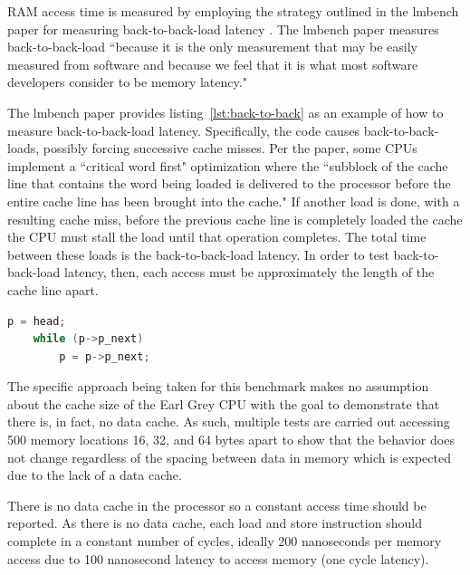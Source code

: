\documentclass{article}
\begin{document}
RAM access time is measured by employing the strategy outlined in the lmbench paper for measuring back-to-back-load latency \cite{lmbench}. The lmbench paper measures back-to-back-load ``because it is the only measurement that may be easily measured from software and because we feel that it is what most software developers consider to be memory latency." \cite{lmbench} 

The lmbench paper provides listing~\ref{lst:back-to-back} as an example of how to measure back-to-back-load latency. Specifically, the code causes back-to-back-loads, possibly forcing successive cache misses. Per the paper, some CPUs implement a ``critical word first" optimization where the ``subblock of the cache line that contains the word being loaded is delivered to the processor before the entire cache line has been brought into the cache." \cite{lmbench} If another load is done, with a resulting cache miss, before the previous cache line is completely loaded the cache the CPU must stall the load until that operation completes. The total time between these loads is the back-to-back-load latency. In order to test back-to-back-load latency, then, each access must be approximately the length of the cache line apart.

\begin{lstlisting}[language=c, caption={lmbench back-to-back memory test example}, label={lst:back-to-back}]
    p = head;
    while (p->p_next)
        p = p->p_next;
\end{lstlisting}


The specific approach being taken for this benchmark makes no assumption about the cache size of the Earl Grey CPU with the goal to demonstrate that there is, in fact, no data cache. As such, multiple tests are carried out accessing 500 memory locations 16, 32, and 64 bytes apart to show that the behavior does not change regardless of the spacing between data in memory which is expected due to the lack of a data cache.

There is no data cache in the processor so a constant access time should be reported. As there is no data cache, each load and store instruction should complete in a constant number of cycles, ideally 200 nanoseconds per memory access due to 100 nanosecond latency to access memory (one cycle latency)\cite{opentitan-latency}.
\end{document}

